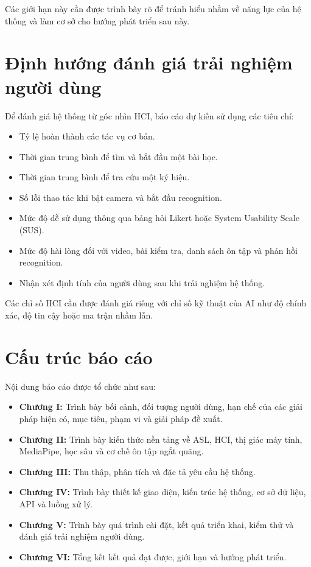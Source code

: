 Các giới hạn này cần được trình bày rõ để tránh hiểu nhầm về năng lực của hệ
thống và làm cơ sở cho hướng phát triển sau này.

\section{Định hướng đánh giá trải nghiệm người dùng}

Để đánh giá hệ thống từ góc nhìn HCI, báo cáo dự kiến sử dụng các tiêu chí:

\begin{itemize}
  \item Tỷ lệ hoàn thành các tác vụ cơ bản.
  \item Thời gian trung bình để tìm và bắt đầu một bài học.
  \item Thời gian trung bình để tra cứu một ký hiệu.
  \item Số lỗi thao tác khi bật camera và bắt đầu recognition.
  \item Mức độ dễ sử dụng thông qua bảng hỏi Likert hoặc System Usability Scale
        (SUS).
  \item Mức độ hài lòng đối với video, bài kiểm tra, danh sách ôn tập và phản
        hồi recognition.
  \item Nhận xét định tính của người dùng sau khi trải nghiệm hệ thống.
\end{itemize}

Các chỉ số HCI cần được đánh giá riêng với chỉ số kỹ thuật của AI như độ chính
xác, độ tin cậy hoặc ma trận nhầm lẫn.

\section{Cấu trúc báo cáo}

Nội dung báo cáo được tổ chức như sau:

\begin{itemize}
  \item \textbf{Chương I:} Trình bày bối cảnh, đối tượng người dùng, hạn chế của
        các giải pháp hiện có, mục tiêu, phạm vi và giải pháp đề xuất.
  \item \textbf{Chương II:} Trình bày kiến thức nền tảng về ASL, HCI, thị giác
        máy tính, MediaPipe, học sâu và cơ chế ôn tập ngắt quãng.
  \item \textbf{Chương III:} Thu thập, phân tích và đặc tả yêu cầu hệ thống.
  \item \textbf{Chương IV:} Trình bày thiết kế giao diện, kiến trúc hệ thống, cơ
        sở dữ liệu, API và luồng xử lý.
  \item \textbf{Chương V:} Trình bày quá trình cài đặt, kết quả triển khai, kiểm
        thử và đánh giá trải nghiệm người dùng.
  \item \textbf{Chương VI:} Tổng kết kết quả đạt được, giới hạn và hướng phát
        triển.
\end{itemize}
